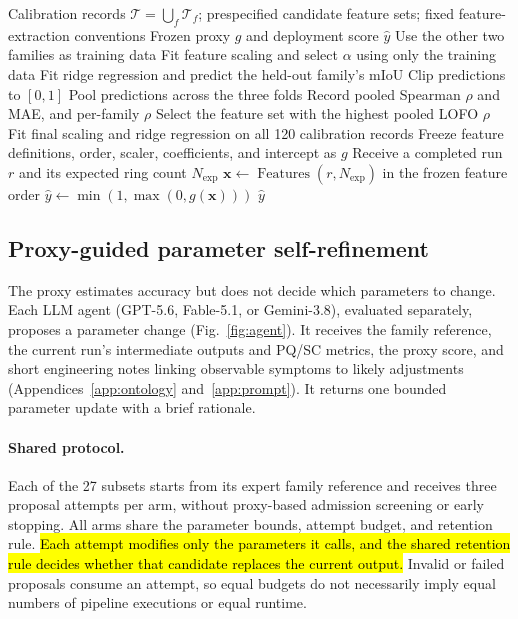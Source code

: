 \documentclass[a4paper,fleqn]{cas-dc}
\begin{document}
{\begin{algorithm}[ht]
\caption{Proxy calibration and deployment scoring}
\label{alg:proxy}
\begin{algorithmic}[1]
\Require Calibration records $\mathcal{T}=\bigcup_f\mathcal{T}_f$; prespecified candidate feature sets; fixed feature-extraction conventions
\Ensure Frozen proxy $g$ and deployment score $\hat{y}$
        \State Use the other two families as training data
        \State Fit feature scaling and select $\alpha$ using only the training data
        \State Fit ridge regression and predict the held-out family's mIoU
        \State Clip predictions to $[0,1]$
    \EndFor
    \State Pool predictions across the three folds
    \State Record pooled Spearman $\rho$ and MAE, and per-family $\rho$
\EndFor
\State Select the feature set with the highest pooled LOFO $\rho$
\State Fit final scaling and ridge regression on all 120 calibration records
\State Freeze feature definitions, order, scaler, coefficients, and intercept as $g$
\Statex
\State Receive a completed run $r$ and its expected ring count $N_{\mathrm{exp}}$
\State $\mathbf{x}\gets\operatorname{Features}(r,N_{\mathrm{exp}})$ in the frozen feature order
\State $\hat{y}\gets\min(1,\max(0,g(\mathbf{x})))$
\State \Return $\hat{y}$
\end{algorithmic}
\end{algorithm}


\subsection{Proxy-guided parameter self-refinement}
\label{sec:agent-design}

The proxy estimates accuracy but does not decide which parameters to change. Each LLM agent (GPT-5.6, Fable-5.1, or Gemini-3.8), evaluated separately, proposes a parameter change (Fig.~\ref{fig:agent}). It receives the family reference, the current run's intermediate outputs and PQ/SC metrics, the proxy score, and short engineering notes linking observable symptoms to likely adjustments (Appendices~\ref{app:ontology} and~\ref{app:prompt}). It returns one bounded parameter update with a brief rationale.

\paragraph{Shared protocol.}
Each of the 27 subsets starts from its expert family reference and receives three proposal attempts per arm, without proxy-based admission screening or early stopping. All arms share the parameter bounds, attempt budget, and retention rule. \hl{Each attempt modifies only the parameters it calls, and the shared retention rule decides whether that candidate replaces the current output. } Invalid or failed proposals consume an attempt, so equal budgets do not necessarily imply equal numbers of pipeline executions or equal runtime.

}
\end{document}
